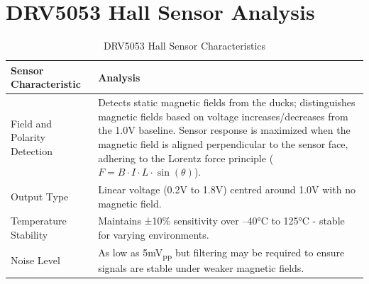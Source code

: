 \section{DRV5053 Hall Sensor Analysis}
\begin{table}[H]
    \centering
    \begin{tabular}{|p{4cm}|p{10cm}|}
        \hline
        \textbf{Sensor Characteristic} & \textbf{Analysis}                                                                                                                                                                                                                                                                                                                     \\
        \hline
        Field and Polarity Detection   & Detects static magnetic fields from the ducks; distinguishes magnetic fields based on voltage increases/decreases from the 1.0V baseline. Sensor response is maximized when the magnetic field is aligned perpendicular to the sensor face, adhering to the Lorentz force principle (\( F = B \cdot I \cdot L \cdot \sin(\theta) \)). \\
        \hline
        Output Type                    & Linear voltage (0.2V to 1.8V) centred around 1.0V with no magnetic field.                                                                                                                                                                                                                                                             \\
        \hline
        Temperature Stability          & Maintains ±10\% sensitivity over –40°C to 125°C - stable for varying environments.                                                                                                                                                                                                                                                    \\
        \hline
        Noise Level                    & As low as 5mV\textsubscript{pp} but filtering may be required to ensure signals are stable under weaker magnetic fields.                                                                                                                                                                                                              \\
        \hline
    \end{tabular}
    \caption{DRV5053 Hall Sensor Characteristics}
    \label{tab:sensor_characteristics}
\end{table}

